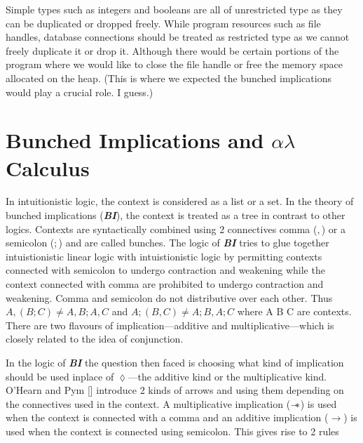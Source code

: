 Simple types such as integers and booleans are all of unrestricted type as
they can be duplicated or dropped freely.
While program resources such as file handles, database connections
should be treated as restricted type as we cannot freely duplicate it
or drop it. Although there would be certain portions of the program where we would
like to close the file handle or free the memory space allocated on the heap.
(This is where we expected the bunched implications would play a crucial role. I guess.)

\section{Bunched Implications and $\alpha\lambda$ Calculus}

In intuitionistic logic, the context is considered as a list or a set. In the theory of
bunched implications (\textbf{\em BI}), the context is treated as a tree in contrast to other logics. Contexts are syntactically
combined using 2 connectives comma ($,$) or a semicolon ($;$) and are called bunches. The logic of \textbf{\em BI}
tries to glue together intuistionistic linear logic with intuistionistic logic by
permitting contexts connected with semicolon to undergo contraction and weakening while the context connected with comma
are prohibited to undergo contraction and weakening. Comma and semicolon do not distributive over each other.
Thus $A,(B;C) \neq A, B ; A,C$ and $A;(B,C) \neq A;B,A;C$ where A B C are contexts.
There are two flavours of implication---additive and multiplicative---which is closely related to the idea of conjunction.
\begin{framed}
\begin{minipage}{1.0\linewidth}
  \begin{prooftree}
  \end{prooftree}
\end{minipage}
\end{framed}
In the logic of {\textbf{\em BI}} the question then faced is choosing what kind of
implication should be used inplace of $\lozenge$---the additive kind or the multiplicative kind.
O'Hearn and Pym [\cite{ohearn_logic_1999}] introduce 2 kinds of arrows
and using them depending on the connectives used in the context. A multiplicative implication ($\sepimp$)
is used when the context is connected with a comma and an additive implication ($\rightarrow$) is used when the
context is connected using semicolon. This gives rise to 2 rules
